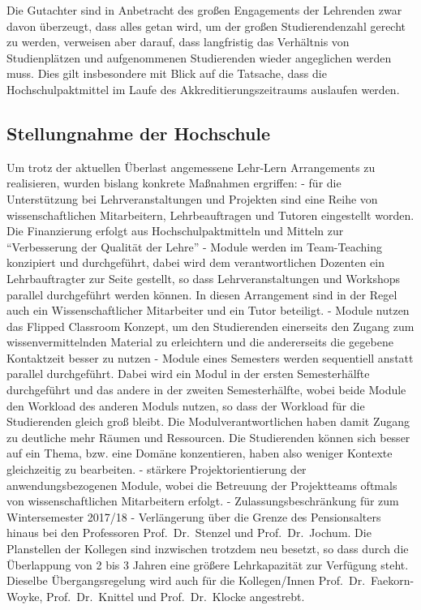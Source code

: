 \begin{siderules}
Die Gutachter sind in Anbetracht des großen Engagements der Lehrenden
zwar davon überzeugt, dass alles getan wird, um der großen
Studierendenzahl gerecht zu werden, verweisen aber darauf, dass
langfristig das Verhältnis von Studienplätzen und aufgenommenen
Studierenden wieder angeglichen werden muss. Dies gilt insbesondere mit
Blick auf die Tatsache, dass die Hochschulpaktmittel im Laufe des
Akkreditierungszeitraums auslaufen werden.
\end{siderules}

\subsection{Stellungnahme der
Hochschule}\label{stellungnahme-der-hochschule-4}

Um trotz der aktuellen Überlast angemessene Lehr-Lern Arrangements zu
realisieren, wurden bislang konkrete Maßnahmen ergriffen: - für die
Unterstützung bei Lehrveranstaltungen und Projekten sind eine Reihe von
wissenschaftlichen Mitarbeitern, Lehrbeauftragen und Tutoren eingestellt
worden. Die Finanzierung erfolgt aus Hochschulpaktmitteln und Mitteln
zur ``Verbesserung der Qualität der Lehre'' - Module werden im
Team-Teaching konzipiert und durchgeführt, dabei wird dem
verantwortlichen Dozenten ein Lehrbauftragter zur Seite gestellt, so
dass Lehrveranstaltungen und Workshops parallel durchgeführt werden
können. In diesen Arrangement sind in der Regel auch ein
Wissenschaftlicher Mitarbeiter und ein Tutor beteiligt. - Module nutzen
das Flipped Classroom Konzept, um den Studierenden einerseits den Zugang
zum wissenvermittelnden Material zu erleichtern und die andererseits die
gegebene Kontaktzeit besser zu nutzen - Module eines Semesters werden
sequentiell anstatt parallel durchgeführt. Dabei wird ein Modul in der
ersten Semesterhälfte durchgeführt und das andere in der zweiten
Semesterhälfte, wobei beide Module den Workload des anderen Moduls
nutzen, so dass der Workload für die Studierenden gleich groß bleibt.
Die Modulverantwortlichen haben damit Zugang zu deutliche mehr Räumen
und Ressourcen. Die Studierenden können sich besser auf ein Thema, bzw.
eine Domäne konzentieren, haben also weniger Kontexte gleichzeitig zu
bearbeiten. - stärkere Projektorientierung der anwendungsbezogenen
Module, wobei die Betreuung der Projektteams oftmals von
wissenschaftlichen Mitarbeitern erfolgt. - Zulassungsbeschränkung für
zum Wintersemester 2017/18 - Verlängerung über die Grenze des
Pensionsalters hinaus bei den Professoren Prof.~Dr.~Stenzel und
Prof.~Dr.~Jochum. Die Planstellen der Kollegen sind inzwischen trotzdem
neu besetzt, so dass durch die Überlappung von 2 bis 3 Jahren eine
größere Lehrkapazität zur Verfügung steht. Dieselbe Übergangsregelung
wird auch für die Kollegen/Innen Prof.~Dr.~Faekorn-Woyke,
Prof.~Dr.~Knittel und Prof.~Dr.~Klocke angestrebt.

